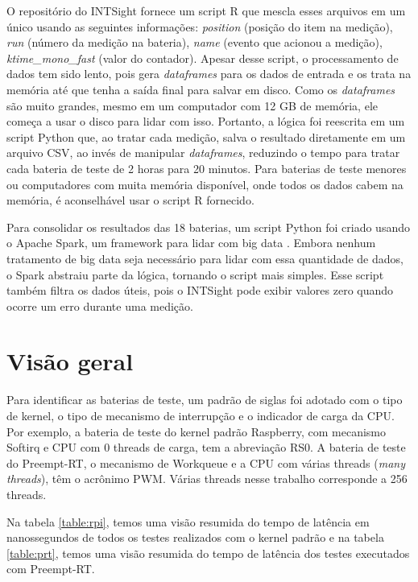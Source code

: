 O repositório do INTSight fornece um script R que mescla esses arquivos em um único usando as seguintes informações: \textit{position} (posição do item na medição), \textit{run} (número da medição na bateria), \textit{name} (evento que acionou a medição), \textit{ktime\_mono\_fast} (valor do contador). Apesar desse script, o processamento de dados tem sido lento, pois gera \textit{dataframes} para os dados de entrada e os trata na memória até que tenha a saída final para salvar em disco. Como os \textit{dataframes} são muito grandes, mesmo em um computador com 12 GB de memória, ele começa a usar o disco para lidar com isso. Portanto, a lógica foi reescrita em um script Python que, ao tratar cada medição, salva o resultado diretamente em um arquivo CSV, ao invés de manipular \textit{dataframes}, reduzindo o tempo para tratar cada bateria de teste de 2 horas para 20 minutos. Para baterias de teste menores ou computadores com muita memória disponível, onde todos os dados cabem na memória, é aconselhável usar o script R fornecido.

Para consolidar os resultados das 18 baterias, um script Python foi criado usando o Apache Spark, um framework para lidar com big data \cite{Spark2009}. Embora nenhum tratamento de big data seja necessário para lidar com essa quantidade de dados, o Spark abstraiu parte da lógica, tornando o script mais simples. Esse script também filtra os dados úteis, pois o INTSight pode exibir valores zero quando ocorre um erro durante uma medição.

\section{Visão geral}

Para identificar as baterias de teste, um padrão de siglas foi adotado com o tipo de kernel, o tipo de mecanismo de interrupção e o indicador de carga da CPU. Por exemplo, a bateria de teste do kernel padrão Raspberry, com mecanismo Softirq e CPU com 0 threads de carga, tem a abreviação RS0. A bateria de teste do Preempt-RT, o mecanismo de Workqueue e a CPU com várias threads (\textit{many threads}), têm o acrônimo PWM. Várias threads nesse trabalho corresponde a 256 threads.

Na tabela \ref{table:rpi}, temos uma visão resumida do tempo de latência em nanossegundos de todos os testes realizados com o kernel padrão e na tabela \ref{table:prt}, temos uma visão resumida do tempo de latência dos testes executados com Preempt-RT.

